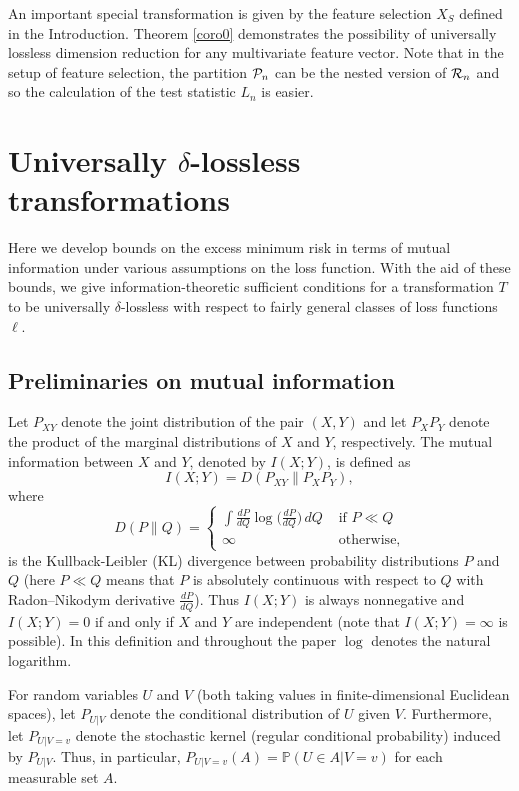 \documentclass[11pt]{article}
\newcounter{aid}
\def\PROB {{\mathbb P}}
\begin{document}
An important special transformation is given by the feature selection $X_S$ defined in the Introduction.
Theorem \ref{coro0} demonstrates the possibility of universally lossless dimension reduction for any multivariate feature vector.
Note that in the setup of feature selection, the partition ${\cal P}_n$ can be the nested version of ${\cal R}_n$ and so the calculation of the test statistic $L_n$ is easier.



\section{Universally $\delta$-lossless transformations}


Here we develop  bounds on the excess minimum risk in terms of  mutual information under various assumptions on the loss function. 
With the aid of these bounds, we give information-theoretic sufficient conditions for a transformation $T$ to be universally $\delta$-lossless with respect to fairly general classes of loss functions~$\ell$.

\label{sec-delta-lossless}



\subsection{Preliminaries on mutual information}

\label{sec-pre}

Let $P_{XY}$ denote the joint distribution of the pair $(X,Y)$ and let $P_XP_Y$
denote the product of the marginal distributions of $X$ and $Y$, respectively. 
The mutual information between $X$ and $Y$, denoted by  $I(X;Y)$, is
defined as
\[
   I(X;Y) = D(P_{XY}\|P_XP_Y),
\]
where 
\[
D(P\|Q) = \begin{cases}
    \int \frac{dP}{dQ} \log \big( \frac{dP}{dQ} \big) \, dQ & \text{ if $P\ll Q$} \\
       \infty & \text{ otherwise,} 
\end{cases}
\]
is the Kullback-Leibler (KL) divergence between probability
distributions $P$ and $Q$ (here $P\ll Q$ means that $P$ is absolutely continuous with respect to $Q$ with Radon–Nikodym derivative $\frac{dP}{dQ}$). Thus $I(X;Y)$ is always nonnegative  and $ I(X;Y) =0$
if and only if $X$ and $Y$ are independent (note that  $
I(X;Y)=\infty$ is possible). In this  definition  and throughout the paper $\log$ denotes the natural logarithm. 


For random variables $U$ and $V$ (both taking values in finite-dimensional
Euclidean spaces), let $P_{U|V}$ denote the conditional
distribution of $U$ given $V$. Furthermore, let $P_{U|V=v}$ denote the stochastic kernel
(regular conditional probability) induced by $P_{U|V}$. Thus, in particular,
$P_{U|V=v}(A) =\PROB(U\in A|V=v)$ for each measurable set $A$.
\end{document}
